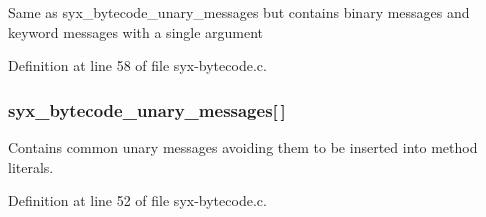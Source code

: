 Same as syx\_\-bytecode\_\-unary\_\-messages but contains binary messages and keyword messages with a single argument 

Definition at line 58 of file syx-bytecode.c.\hypertarget{syx-bytecode_8h_2d5efd1c4984dc8e4a86ac7062a41716}{
\subsubsection{ {\bf syx\_\-bytecode\_\-unary\_\-messages}\mbox{[}$\,$\mbox{]}}}
\label{syx-bytecode_8h_2d5efd1c4984dc8e4a86ac7062a41716}


Contains common unary messages avoiding them to be inserted into method literals. 

Definition at line 52 of file syx-bytecode.c.
